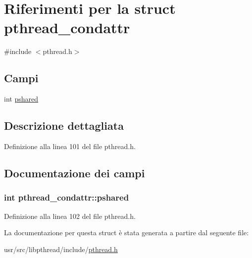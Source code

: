 \hypertarget{structpthread__condattr}{\section{Riferimenti per la struct pthread\+\_\+condattr}
\label{structpthread__condattr}
}


{\ttfamily \#include $<$pthread.\+h$>$}

\subsection*{Campi}
\begin{DoxyCompactItemize}
\item 
int \hyperlink{structpthread__condattr_a2cf7aea8228b9cee52cc0eccc4492fd7}{pshared}
\end{DoxyCompactItemize}


\subsection{Descrizione dettagliata}


Definizione alla linea 101 del file pthread.\+h.



\subsection{Documentazione dei campi}
\hypertarget{structpthread__condattr_a2cf7aea8228b9cee52cc0eccc4492fd7}{
\subsubsection[{pshared}]{\setlength{\rightskip}{0pt plus 5cm}int pthread\+\_\+condattr\+::pshared}}\label{structpthread__condattr_a2cf7aea8228b9cee52cc0eccc4492fd7}


Definizione alla linea 102 del file pthread.\+h.



La documentazione per questa struct è stata generata a partire dal seguente file\+:\begin{DoxyCompactItemize}
\item 
usr/src/libpthread/include/\hyperlink{pthread_8h}{pthread.\+h}\end{DoxyCompactItemize}
